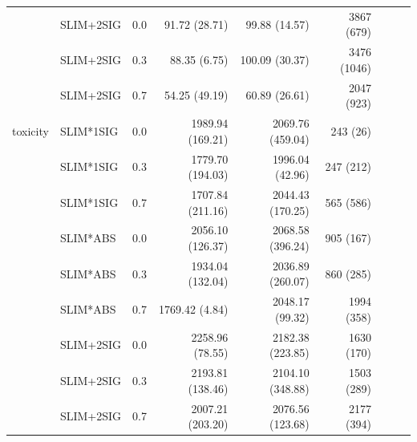\begin{longtable}{lllrrrrrr}
 & SLIM+2SIG & 0.0 & 91.72 (28.71) & 99.88 (14.57) & 3867 (679) \\
 & SLIM+2SIG & 0.3 & 88.35 (6.75) & 100.09 (30.37) & 3476 (1046) \\
 & SLIM+2SIG & 0.7 & 54.25 (49.19) & 60.89 (26.61) & 2047 (923) \\
\midrule
toxicity & SLIM*1SIG & 0.0 & 1989.94 (169.21) & 2069.76 (459.04) & 243 (26) \\
 & SLIM*1SIG & 0.3 & 1779.70 (194.03) & 1996.04 (42.96) & 247 (212) \\
 & SLIM*1SIG & 0.7 & 1707.84 (211.16) & 2044.43 (170.25) & 565 (586) \\
 & SLIM*ABS & 0.0 & 2056.10 (126.37) & 2068.58 (396.24) & 905 (167) \\
 & SLIM*ABS & 0.3 & 1934.04 (132.04) & 2036.89 (260.07) & 860 (285) \\
 & SLIM*ABS & 0.7 & 1769.42 (4.84) & 2048.17 (99.32) & 1994 (358) \\
 & SLIM+2SIG & 0.0 & 2258.96 (78.55) & 2182.38 (223.85) & 1630 (170) \\
 & SLIM+2SIG & 0.3 & 2193.81 (138.46) & 2104.10 (348.88) & 1503 (289) \\
 & SLIM+2SIG & 0.7 & 2007.21 (203.20) & 2076.56 (123.68) & 2177 (394) \\
\end{longtable}